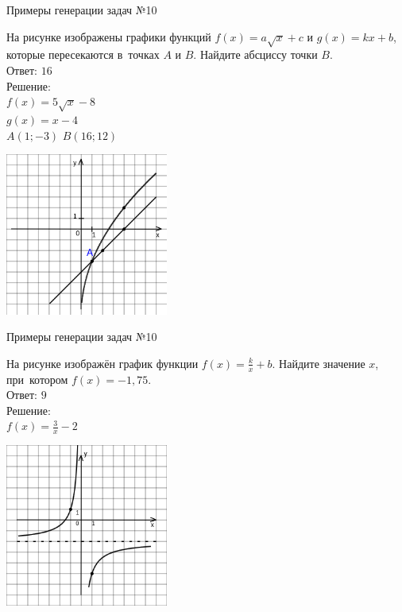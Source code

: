 \documentclass[aspectratio=169,12pt]{beamer}
\begin{document}
\begin{frame}{Примеры генерации задач №10}
    \begin{multicols}{2}
          
        На рисунке изображены графики функций $f (x)=a\sqrt{x}+c$ и $g (x)=kx+b$, которые пересекаются в~точках $A$ и $B$. Найдите абсциссу точки $B$.\\
        
        Ответ: $16$\\

        Решение: \\
        $f (x)=5\sqrt{x}-8$\\
        $g (x)=x-4$\\
        $A (1; -3)$\qquad
        $B (16; 12)$


        \includegraphics[width=0.4\textwidth]{images/230486231093499n0}
    \end{multicols}
         
\end{frame}

\begin{frame}{Примеры генерации задач №10}
    \begin{multicols}{2}
        На рисунке изображён график функции $f (x)=\frac{k}{x}+b$. Найдите значение $x$, при~котором $f (x)=-1,75$.\\

        Ответ: $9$\\

        Решение: \\
        $f (x)=\frac{3}{x}-2$

        \includegraphics[width=0.4\textwidth]{images/5535657652049n0.png}
    \end{multicols}
    
\end{frame}
\end{document}
